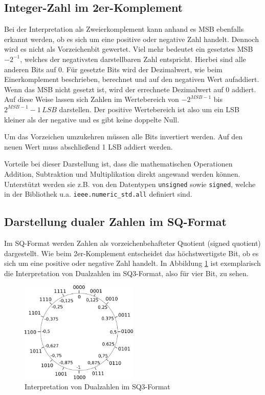 \subsection{Integer-Zahl im 2er-Komplement}\label{sec:Integer2erKomplement}

Bei der Interpretation als Zweierkomplement kann anhand es MSB ebenfalls erkannt werden, ob es sich um eine positive oder negative Zahl handelt. Dennoch wird es nicht
als Vorzeichenbit gewertet. Viel mehr bedeutet ein gesetztes MSB $-2^{-1}$, welches der negativsten darstellbaren Zahl entspricht. Hierbei sind alle anderen 
Bits auf 0. Für gesetzte Bits wird der Dezimalwert, wie beim Einerkomplement beschrieben, berechnet und auf den negativen Wert aufaddiert. Wenn das MSB nicht gesetzt
ist, wird der errechnete Dezimalwert auf 0 addiert. Auf diese Weise lassen sich Zahlen im Wertebereich von $-2^{MSB-1}$ bis $2^{MSB-1}-1 \,LSB$ darstellen. Der positive
Wertebereich ist also um ein LSB kleiner als der negative und es gibt keine doppelte Null.

Um das Vorzeichen umzukehren müssen alle Bits invertiert werden. Auf den neuen Wert muss abschließend 1 LSB addiert werden.

Vorteile bei dieser Darstellung ist, dass die mathematischen Operationen Addition, Subtraktion und Multiplikation direkt angewand werden können. Unterstützt werden sie z.B. 
von den Datentypen \texttt{unsigned} sowie \texttt{signed}, welche in der Bibliothek u.a. \texttt{ieee.numeric\_std.all} definiert sind.


\subsection{Darstellung dualer Zahlen im SQ-Format}
Im SQ-Format werden Zahlen als vorzeichenbehafteter Quotient (signed quotient) dargestellt. Wie beim 2er-Komplement entscheidet das höchstwertigste Bit, ob es sich um eine
positive oder negative Zahl handelt. In Abbildung \ref{pic:SQKreis} ist exemplarisch die Interpretation von Dualzahlen im SQ3-Format, also für vier Bit, zu sehen.

\begin{figure}[ht!]
 \centering
 \includegraphics[width=0.5\textwidth]{img/SQ-Kreis.png}
 \caption{Interpretation von Dualzahlen im SQ3-Format}
 \label{pic:SQKreis}
\end{figure}


